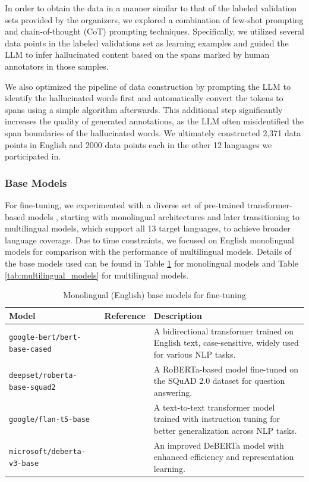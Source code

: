 \documentclass[11pt]{article}
\begin{document}
In order to obtain the data in a manner similar to that of the labeled validation sets provided by the organizers, we explored a combination of few-shot prompting and chain-of-thought (CoT) prompting techniques. Specifically, we utilized several data points in the labeled validations set as learning examples and guided the LLM to infer hallucinated content based on the spans marked by human annotators in those samples. 

We also optimized the pipeline of data construction by prompting the LLM to identify the hallucinated words first and automatically convert the tokens to spans using a simple algorithm afterwards. This additional step significantly increases the quality of generated annotations, as the LLM often misidentified the span boundaries of the hallucinated words. We ultimately constructed 2,371 data points in English and 2000 data points each in the other 12 languages we participated in.


\subsubsection{Base Models}
For fine-tuning, we experimented with a diverse set of pre-trained transformer-based models \cite{vaswani2017attention}, starting with monolingual architectures and later transitioning to multilingual models, which support all 13 target languages, to achieve broader language coverage. Due to time constraints, we focused on English monolingual models for comparison with the performance of multilingual models. Details of the base models used can be found in Table \ref{tab:monolingual_models} for monolingual models and Table \ref{tab:multilingual_models} for multilingual models.

\begin{table}[h]
    \centering
    \begin{tabular}{|l|l|p{6.5cm}|}
        \hline
        \textbf{Model} & \textbf{Reference} & \textbf{Description} \\ \hline
        \centering\texttt{google-bert/bert-base-cased} & \cite{DBLP:journals/corr/abs-1810-04805} & A bidirectional transformer trained on English text, case-sensitive, widely used for various NLP tasks. \\ \hline
        \texttt{deepset/roberta-base-squad2} & \cite{deepset_roberta_squad2} & A RoBERTa-based model fine-tuned on the SQuAD 2.0 dataset for question answering. \\ \hline
        \texttt{google/flan-t5-base} & \cite{https://doi.org/10.48550/arxiv.2210.11416} & A text-to-text transformer model trained with instruction tuning for better generalization across NLP tasks. \\ \hline
        \texttt{microsoft/deberta-v3-base} & \cite{he2021debertav3} & An improved DeBERTa model with enhanced efficiency and representation learning. \\ \hline
    \end{tabular}
    \caption{Monolingual (English) base models for fine-tuning}
    \label{tab:monolingual_models}
\end{table}
\end{document}
